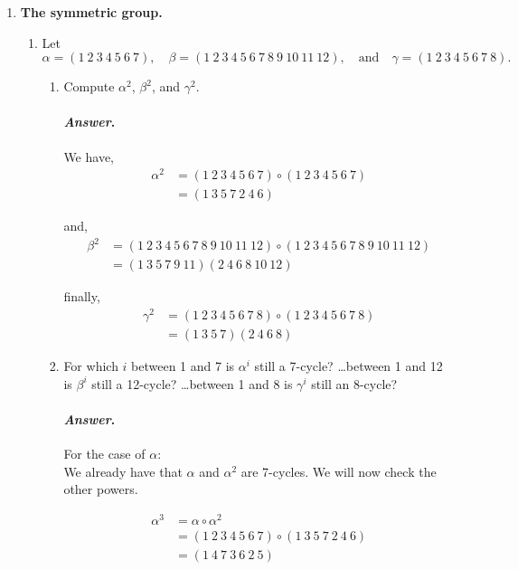 \documentclass[11pt, reqno]{amsart}
\theoremstyle{plain}
\theoremstyle{definition}
\theoremstyle{example}
\newenvironment{ans}{\color{black}\medskip \paragraph*{\emph{Answer}.}}{\hfill \break  $~\!\!$ \dotfill \medskip }
\begin{document}
\begin{enumerate}[1.]
\begin{enumerate}
\begin{proof}
Hence, the elements $s_1$ and $s_2$ together with the relations shown above fully describe the initial presentation of $D_{2n}$.
\end{proof}	
\end{enumerate}

\item {\bf The symmetric group. }
\begin{enumerate}
\item Let $$\alpha = (1~2~3~4~5~6~7), \quad \beta =(1~2~3~4~5~6~7~8~9~10~11~12), \quad \text{and}\quad \gamma = (1~2~3~4~5~6~7~8).$$
	\begin{enumerate}
	\item Compute $\alpha^2$, $\beta^2$, and $\gamma^2$.
	
	\begin{ans}
	
	We have,
	\begin{align*}
	\alpha^2 &= (1~2~3~4~5~6~7) \circ (1~2~3~4~5~6~7)\\
	&= (1~3~5~7~2~4~6)
	\end{align*}
	
	and,
	\begin{align*}
	\beta^2 &= (1~2~3~4~5~6~7~8~9~10~11~12) \circ (1~2~3~4~5~6~7~8~9~10~11~12)\\
	&= (1~3~5~7~9~11)(2~4~6~8~10~12)
	\end{align*}
	
	finally,
	\begin{align*}
	\gamma^2 &= (1~2~3~4~5~6~7~8) \circ (1~2~3~4~5~6~7~8)\\
	&= (1~3~5~7)(2~4~6~8)
	\end{align*}
	\end{ans}
	\item For which $i$ between 1 and 7 is $\alpha^i$ still a 7-cycle? \dots between 1 and 12 is $\beta^i$ still a 12-cycle? \dots between 1 and 8 is $\gamma^i$ still an 8-cycle?
	
	\begin{ans}
	For the case of $\alpha$:\\
	
	We already have that $\alpha$ and $\alpha^2$ are 7-cycles. We will now check the other powers.
	
	\begin{align*}
	\alpha^3 &= \alpha \circ \alpha^2\\
	&= (1~2~3~4~5~6~7) \circ (1~3~5~7~2~4~6)\\
	&= (1~4~7~3~6~2~5)
	\end{align*}
	

\end{ans}
\end{enumerate}
\end{enumerate}
\end{enumerate}
\end{document}
